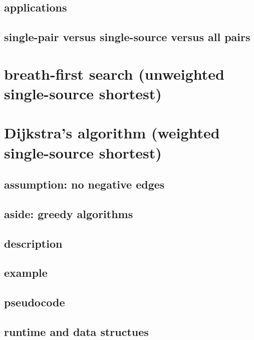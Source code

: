 

\subsection{applications}



\subsection{single-pair versus single-source versus all pairs}



\section{breath-first search (unweighted single-source shortest)}




\section{Dijkstra's algorithm (weighted single-source shortest)}

\subsection{assumption: no negative edges}

\subsection{aside: greedy algorithms}

\subsection{description}

\subsection{example}

\subsection{pseudocode}

\subsection{runtime and data structues}

